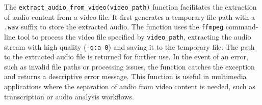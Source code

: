 \noindent
The \texttt{extract\_audio\_from\_video(video\_path)} function facilitates the extraction of audio content from a video file. It first generates a temporary file path with a \texttt{.wav} suffix to store the extracted audio. The function uses the \texttt{ffmpeg} command-line tool to process the video file specified by \texttt{video\_path}, extracting the audio stream with high quality (\texttt{-q:a 0}) and saving it to the temporary file. The path to the extracted audio file is returned for further use. In the event of an error, such as invalid file paths or processing issues, the function catches the exception and returns a descriptive error message. This function is useful in multimedia applications where the separation of audio from video content is needed, such as transcription or audio analysis workflows.


